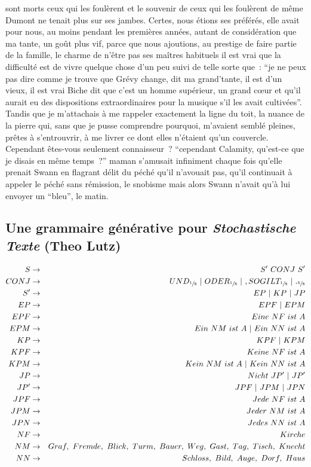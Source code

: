 \documentclass{article}
\begin{document}
sont morts ceux qui les foulèrent et le souvenir de ceux qui les foulèrent de même Dumont ne tenait plus sur ses jambes. Certes, nous étions ses préférés, elle avait pour nous, au moins pendant les premières années, autant de considération que ma tante, un goût plus vif, parce que nous ajoutions, au prestige de faire partie de la famille, le charme de n'être pas ses maîtres habituels il est vrai que la difficulté est de vivre quelque chose d'un peu suivi de telle sorte que~: ``je ne peux pas dire comme je trouve que Grévy change, dit ma grand'tante, il est d'un vieux, il est vrai Biche dit que c'est un homme supérieur, un grand cœur et qu'il aurait eu des dispositions extraordinaires pour la musique s'il les avait cultivées''. Tandis que je m'attachais à me rappeler exactement la ligne du toit, la nuance de la pierre qui, sans que je pusse comprendre pourquoi, m'avaient semblé pleines, prêtes à s'entrouvrir, à me livrer ce dont elles n'étaient qu'un couvercle. Cependant êtes-vous seulement connaisseur~? ``cependant Calamity, qu'est-ce que je disais en même temps~?'' maman s'amusait infiniment chaque fois qu'elle prenait Swann en flagrant délit du péché qu'il n'avouait pas, qu'il continuait à appeler le péché sans rémission, le snobisme mais alors Swann n'avait qu'à lui envoyer un ``bleu'', le matin.
			\newpage
		\subsection{Une grammaire générative pour \textit{Stochastische Texte} (Theo Lutz)}\label{lutz_grammar}
			\begin{eqnarray*}
				S &\rightarrow& S' \ CONJ \ S'\\
				CONJ &\rightarrow& UND_{\sfrac{1}{8}} \ | \ ODER_{\sfrac{1}{8}} \ | \ , SO GILT_{\sfrac{1}{8}} \ | \ ._{\sfrac{5}{8}} \\
				S' &\rightarrow& EP\ | \ KP \ |\ JP\\
				EP & \rightarrow& EPF \ | \ EPM\\
				EPF & \rightarrow& Eine \ NF \ ist \ A\\
				EPM & \rightarrow& Ein \ NM \ ist \ A \ | \ Ein \ NN \ ist \ A\\
				KP & \rightarrow& KPF \ | \ KPM\\
				KPF & \rightarrow& Keine \ NF \ ist \ A\\
				KPM & \rightarrow& Kein \ NM \ ist \ A \ | \ Kein \ NN \ ist \ A\\
				JP & \rightarrow& Nicht \ JP' \ | \ JP'\\
				JP' & \rightarrow& JPF \ | \ JPM \ | \ JPN\\
				JPF & \rightarrow& Jede \ NF \ ist \ A\\
				JPM & \rightarrow& Jeder \ NM \ ist \ A\\
				JPN & \rightarrow& Jedes \ NN \ ist \ A\\
				NF & \rightarrow& Kirche\\
				NM & \rightarrow& Graf, \ Fremde, \ Blick, \ Turm, \ Bauer, \ Weg, \ Gast, \ Tag, \ Tisch, \ Knecht\\
				NN &\rightarrow& Schloss, \ Bild, \ Auge, \ Dorf, \ Haus\\
			\end{eqnarray*}
			\newpage
\end{document}
